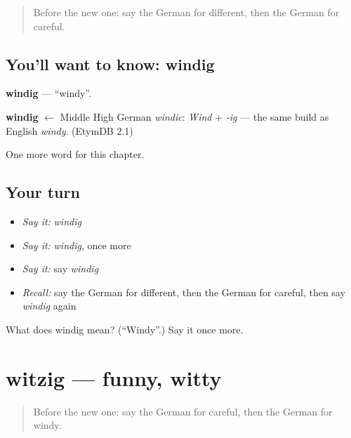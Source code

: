 \label{lesson:GE-C224-windig}



\begin{quote}
Before the new one: say the German for different, then the German for careful.
\end{quote}

\subsection*{You'll want to know: windig}
\textbf{windig} — \textquotedblleft{}windy\textquotedblright{}.

\begin{cousinweb}
\textbf{windig} $\leftarrow$ Middle High German \emph{windic}: \emph{Wind} + \emph{-ig} — the same build as English \emph{windy}. (EtymDB 2.1)
\end{cousinweb}

\begin{grammarlens}[title={What you've built}]
One more word for this chapter.
\end{grammarlens}

\subsection*{Your turn}
\begin{itemize}
\raggedright
  \item \emph{Say it:} \emph{windig}
  \item \emph{Say it:} \emph{windig}, once more
  \item \emph{Say it:} say \emph{windig}
  \item \emph{Recall:} say the German for different, then the German for careful, then say \emph{windig} again
\end{itemize}

\begin{tcolorbox}[breakable,colback=teal!4,colframe=teal!35!black,title={Before you move on}]
What does windig mean? (\textquotedblleft{}Windy\textquotedblright{}.) Say it once more.
\end{tcolorbox}
\section[witzig]{witzig — funny, witty}

\label{lesson:GE-C224-witzig}



\begin{quote}
Before the new one: say the German for careful, then the German for windy.
\end{quote}

